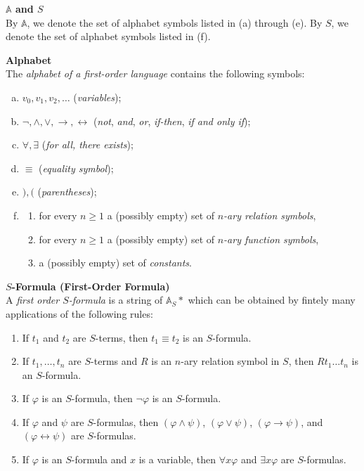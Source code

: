 \documentclass{fank1basedocument}
\begin{document}
{\large\textbf{$\mathbb{A}$ and $S$}}\\
By $\mathbb{A}$, we denote the set of alphabet symbols listed in (a) through (e). By $S$, we denote the set of alphabet symbols listed in (f).

\vspace{1em}

{\large\textbf{Alphabet}}\\
The \textit{alphabet of a first-order language} contains the following symbols:
\begin{enumerate}[(a)]
	\item $v_0,v_1,v_2,\dots$ (\textit{variables});
	\item $\lnot,\land,\lor,\rightarrow,\leftrightarrow$ (\textit{not}, \textit{and}, \textit{or}, \textit{if-then}, \textit{if and only if});
	\item $\forall,\exists$ (\textit{for all, there exists});
	\item $\equiv$ (\textit{equality symbol});
	\item $),($ (\textit{parentheses});
	\item
		\begin{enumerate}[1.]
			\item for every $n\geq 1$ a (possibly empty) set of \textit{$n$-ary relation symbols},
			\item for every $n\geq 1$ a (possibly empty) set of \textit{$n$-ary function symbols},
			\item a (possibly empty) set of \textit{constants}.
		\end{enumerate}
\end{enumerate}

\vspace{1em}

{\large\textbf{$S$-Formula (First-Order Formula)}}\\
A \textit{first order $S$-formula} is a string of $\mathbb{A}_S*$ which can be obtained by fintely many applications of the following rules:
\begin{enumerate}[label={(F\arabic*)}]
	\item If $t_1$ and $t_2$ are $S$-terms, then $t_1\equiv t_2$ is an $S$-formula.
	\item If $t_1,\dots,t_n$ are $S$-terms and $R$ is an $n$-ary relation symbol in $S$, then $Rt_1\dots t_n$ is an $S$-formula.
	\item If $\varphi$ is an $S$-formula, then $\lnot\varphi$ is an $S$-formula.
	\item If $\varphi$ and $\psi$ are $S$-formulas, then $(\varphi\land\psi)$, $(\varphi\lor\psi)$, $(\varphi\rightarrow\psi)$, and $(\varphi\leftrightarrow\psi)$ are $S$-formulas.
	\item If $\varphi$ is an $S$-formula and $x$ is a variable, then $\forall x\varphi$ and $\exists x\varphi$ are $S$-formulas.
\end{enumerate}
\end{document}
